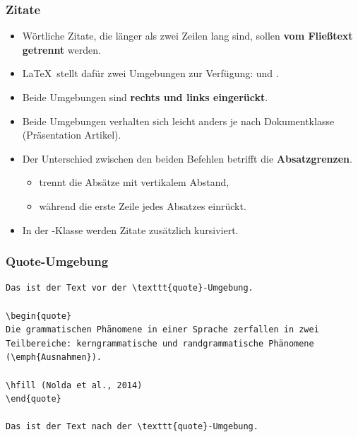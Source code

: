 \begin{frame}[fragile]
\frametitle{Zitate}
\begin{itemize}
\item Wörtliche Zitate, die länger als zwei Zeilen lang sind, sollen \textbf{vom Fließtext getrennt} werden.

\item \LaTeX\ stellt dafür zwei Umgebungen zur Verfügung: \textbf{} und \textbf{}.

\item Beide Umgebungen sind \textbf{rechts und links eingerückt}.

\item Beide Umgebungen verhalten sich leicht anders je nach Dokumentklasse (\zB Präsentation \vs Artikel).

\item Der Unterschied zwischen den beiden Befehlen betrifft die \textbf{Absatzgrenzen}.

\begin{itemize}
	\item {} trennt die Absätze mit vertikalem Abstand, 
	
	\item während  die erste Zeile jedes Absatzes einrückt.		
\end{itemize}

\item In der -Klasse werden Zitate zusätzlich kursiviert.
\end{itemize}
\end{frame}

\begin{frame}[fragile]
\frametitle{Quote-Umgebung}


\begin{lstlisting}
Das ist der Text vor der \texttt{quote}-Umgebung.

\begin{quote}
Die grammatischen Phänomene in einer Sprache zerfallen in zwei 
Teilbereiche: kerngrammatische und randgrammatische Phänomene
(\emph{Ausnahmen}).

\hfill (Nolda et al., 2014)
\end{quote}

Das ist der Text nach der \texttt{quote}-Umgebung.
\end{lstlisting}

\end{frame}


